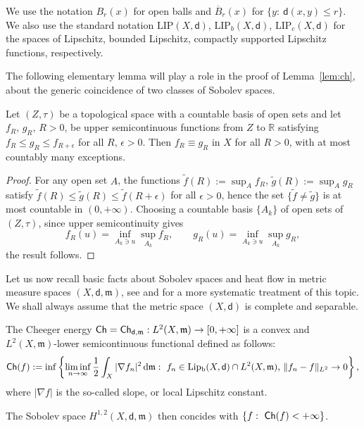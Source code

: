\documentclass[a4paper,11pt,reqno]{article}
\numberwithin{equation}{section}
\theoremstyle{plain}
\theoremstyle{definition}
\theoremstyle{remark}
\newcommand{\di}{\mathop{}\!\mathrm{d}}
\newcommand{\Ch}{{\sf Ch}}
\DeclareMathOperator{\Lipb}{Lip_b}
\newcommand{\dist}{\mathsf{d}}
\newcommand{\meas}{\mathfrak{m}}
\begin{document}
We use the notation $B_r(x)$ for open balls and $\overline{B}_r(x)$ for $\{y:\ \dist(x,y)\leq r\}$.
We also use the standard notation $\mathrm{LIP}(X,\dist)$, $\mathrm{LIP}_b(X, \dist)$, $\mathrm{LIP}_c(X,\dist)$ for the
spaces of Lipschitz, bounded Lipschitz, compactly supported Lipschitz functions, respectively. 

The following elementary lemma will play a role in the proof of Lemma~\ref{lem:ch}, about the generic
coincidence of two classes of Sobolev spaces.

\begin{lemma} \label{lem:ulam} Let $(Z,\tau)$ be a topological space with a countable basis of open sets
and let $f_R,\,g_R$, $R>0$, be upper semicontinuous
functions from $Z$ to $\mathbb{R}$ satisfying $f_R\leq g_R\leq f_{R+\epsilon}$ for all $R,\,\epsilon>0$. 
Then $f_R\equiv g_R$ in $X$ for all $R>0$, with at most countably many exceptions.
\end{lemma}
\begin{proof} For any open set $A$, the functions 
$\tilde{f}(R):=\sup_A f_R$,  $\tilde{g}(R):=\sup_A g_R$
satisfy $\tilde{f}(R)\leq\tilde{g}(R)\leq\tilde{f}(R+\epsilon)$ for all $\epsilon>0$, 
hence the set $\{\tilde{f}\neq\tilde{g}\}$ is at most countable in $(0,+\infty)$. 
Choosing a countable basis $\{A_k\}$ of open sets of $(Z,\tau)$, since upper semicontinuity gives
$$
f_R(u)=\inf_{A_k\ni u} \sup_{A_k} f_R,\qquad
g_R(u)=\inf_{A_k\ni u} \sup_{A_k} g_R,
$$
the result follows.
\end{proof}

Let us now recall basic facts about Sobolev spaces and heat flow in metric measure spaces 
$(X,\dist,\meas)$, see \cite{AmbrosioGigliSavare13} and \cite{Gigli1} for a more systematic treatment of this topic. 
We shall always assume that the metric space $(X,\dist)$ is complete and separable. 

\begin{definition}\label{def:Chee}
The Cheeger energy
$\Ch=\Ch_{\dist,\meas}:L^2(X,\meas)\to [0,+\infty]$ is a convex and $L^2(X,\meas)$-lower semicontinuous functional defined as follows:
\begin{equation}\label{eq:defchp}
\Ch(f):=\inf\left\{\liminf_{n\to\infty}\frac 12\int_X|\nabla  f_n|^2\di\meas:\ \text{$f_n\in\Lipb(X,\dist)\cap L^2(X,\meas)$, $\|f_n-f\|_{L^2}\to 0$}\right\}, 
\end{equation}
where $|\nabla f|$ is the so-called slope, or local Lipschitz constant.

The Sobolev space $H^{1,2}(X,\dist,\meas)$ then concides with $\{f:\ \Ch(f)<+\infty\}$. 
\end{definition}
\end{document}

